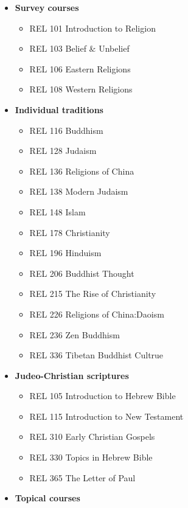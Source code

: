 \documentclass[
  letterpaper,
]{scrbook}
\providecommand{\tightlist}{%
  \setlength{\itemsep}{0pt}\setlength{\parskip}{0pt}}
\begin{document}
\begin{itemize}
\tightlist
\item
  \textbf{Survey courses}

  \begin{itemize}
  \tightlist
  \item
    REL 101 Introduction to Religion
  \item
    REL 103 Belief \& Unbelief
  \item
    REL 106 Eastern Religions
  \item
    REL 108 Western Religions
  \end{itemize}
\item
  \textbf{Individual traditions}

  \begin{itemize}
  \tightlist
  \item
    REL 116 Buddhism
  \item
    REL 128 Judaism
  \item
    REL 136 Religions of China
  \item
    REL 138 Modern Judaism
  \item
    REL 148 Islam
  \item
    REL 178 Christianity
  \item
    REL 196 Hinduism
  \item
    REL 206 Buddhist Thought
  \item
    REL 215 The Rise of Christianity
  \item
    REL 226 Religions of China:Daoism
  \item
    REL 236 Zen Buddhism
  \item
    REL 336 Tibetan Buddhist Cultrue
  \end{itemize}
\item
  \textbf{Judeo-Christian scriptures}

  \begin{itemize}
  \tightlist
  \item
    REL 105 Introduction to Hebrew Bible
  \item
    REL 115 Introduction to New Testament
  \item
    REL 310 Early Christian Gospels
  \item
    REL 330 Topics in Hebrew Bible
  \item
    REL 365 The Letter of Paul
  \end{itemize}
\item
  \textbf{Topical courses}


\end{itemize}
\end{document}
